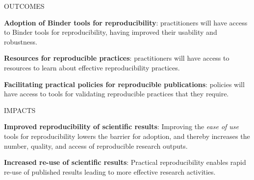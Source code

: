 \begin{multicols}{2}
\begin{summarybox}{OUTCOMES}

\textbf{Adoption of Binder tools for reproducibility}:
practitioners will have access to Binder tools for reproducibility,
having improved their usability and robustness.

\textbf{Resources for reproducible practices}:
practitioners will have access to resources to learn about effective reproducibility practices.

\textbf{Facilitating practical policies for reproducible publications}:
policies will have access to tools for validating reproducible practices that they require.
\end{summarybox}

\begin{summarybox}{IMPACTS}

\textbf{Improved reproducibility of scientific results}: Improving the \emph{ease of use} tools for reproducibility
lowers the barrier for adoption, and thereby increases the number, quality, and
access of reproducible research outputs.

\textbf{Increased re-use of scientific results}: Practical reproducibility
enables rapid re-use of published results leading to more effective research activities.
\end{summarybox}
\end{multicols}
\clearpage

%

%




